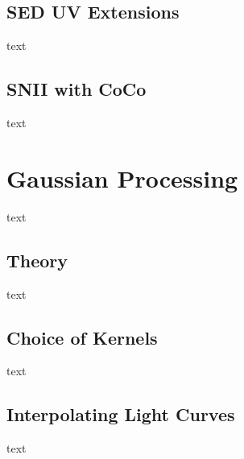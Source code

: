 \subsection{SED UV Extensions}
text
\subsection{SNII with CoCo}
text

\section{Gaussian Processing}
text
\subsection{Theory}
text
\subsection{Choice of Kernels}
text
\subsection{Interpolating Light Curves}
text
